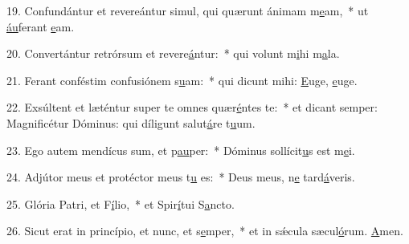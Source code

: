 19. Confundántur et revereántur simul, qui quærunt ánimam m\uline{e}am,~* ut \uline{áu}ferant \uline{e}am.\par 
20. Convertántur retrórsum et revere\uline{á}ntur:~* qui volunt m\uline{i}hi m\uline{a}la.\par 
21. Ferant conféstim confusiónem s\uline{u}am:~* qui dicunt mihi: \uline{E}uge, \uline{e}uge.\par 
22. Exsúltent et læténtur super te omnes quær\uline{é}ntes te:~* et dicant semper: Magnificétur Dóminus: qui díligunt salut\uline{á}re t\uline{u}um.\par 
23. Ego autem mendícus sum, et p\uline{au}per:~* Dóminus sollícit\uline{u}s est m\uline{e}i.\par 
24. Adjútor meus et protéctor meus t\uline{u} es:~* Deus meus, n\uline{e} tard\uline{á}veris.\par 
25. Glória Patri, et F\uline{í}lio,~* et Spir\uline{í}tui S\uline{a}ncto.\par 
26. Sicut erat in princípio, et nunc, et s\uline{e}mper,~* et in sǽcula sæcul\uline{ó}rum. \uline{A}men.\par 

